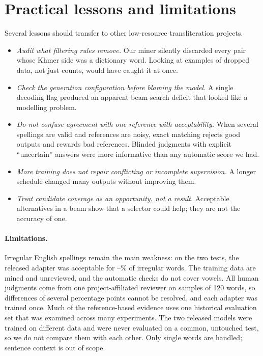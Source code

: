 \documentclass[10pt,a4paper,twocolumn]{article}
\begin{document}
\section{Practical lessons and limitations}
\label{sec:lessons}

Several lessons should transfer to other low-resource transliteration projects.
\begin{itemize}
\item \emph{Audit what filtering rules remove.} Our miner silently discarded every pair whose Khmer side was a
  dictionary word. Looking at examples of dropped data, not just counts, would have caught it at once.
\item \emph{Check the generation configuration before blaming the model.} A single decoding flag produced an
  apparent beam-search deficit that looked like a modelling problem.
\item \emph{Do not confuse agreement with one reference with acceptability.} When several spellings are valid and
  references are noisy, exact matching rejects good outputs and rewards bad references. Blinded judgments with
  explicit ``uncertain'' answers were more informative than any automatic score we had.
\item \emph{More training does not repair conflicting or incomplete supervision.} A longer schedule changed many
  outputs without improving them.
\item \emph{Treat candidate coverage as an opportunity, not a result.} Acceptable alternatives in a beam show that
  a selector could help; they are not the accuracy of one.
\end{itemize}

\paragraph{Limitations.}
Irregular English spellings remain the main weakness: on the two tests, the released adapter was acceptable for
--\% of irregular words. The training data are mined and unreviewed, and the automatic
checks do not cover vowels. All human judgments come from one project-affiliated reviewer on samples of 120 words,
so differences of several percentage points cannot be resolved, and each adapter was trained once. Much of the
reference-based evidence uses one historical evaluation set that was examined across many experiments. The two
released models were trained on different data and were never evaluated on a common, untouched test, so we do not
compare them with each other. Only single words are handled; sentence context is out of scope.
\end{document}
